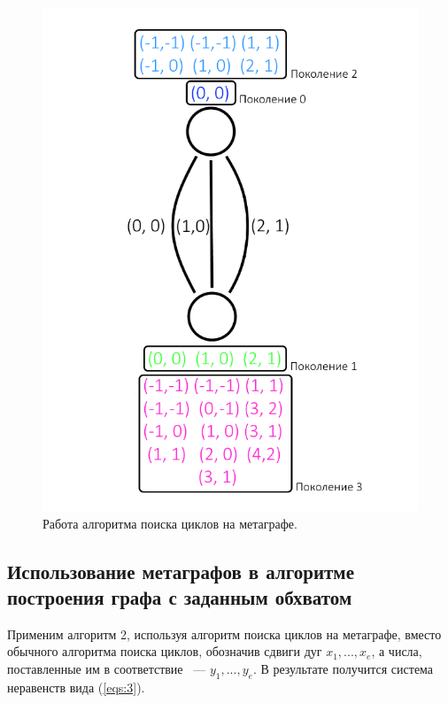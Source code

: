 \documentclass[14pt]{mmcs-article}
\begin{document}
\begin{figure}[H]
  \centering
  \includegraphics[scale=0.5]{Fig_9.png}
  \caption{ Работа алгоритма поиска циклов на метаграфе. }
  \label{metagraph:2}
\end{figure}

\subsection{Использование метаграфов в алгоритме\\ построения графа с заданным обхватом}

Применим алгоритм 2, используя алгоритм поиска циклов на метаграфе, вместо обычного алгоритма поиска циклов, обозначив сдвиги дуг $x_1, ..., x_e$, а числа, поставленные им в соответствие ~--- $y_1, ..., y_e$. В результате получится система неравенств вида (\ref{eqs:3}).
\end{document}
